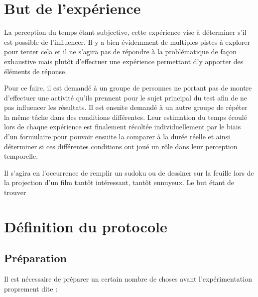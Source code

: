 \documentclass[12pt,fleqn,oneside]{book} %
\begin{document}
\section{But de l'expérience}
La perception du temps étant subjective, cette expérience vise à déterminer s'il est possible de l'influencer. Il y a bien évidemment de multiples pistes à explorer pour tenter cela et il ne s'agira pas de répondre à la problématique de façon exhaustive mais plutôt d'effectuer une expérience permettant d'y apporter des éléments de réponse. 

Pour ce faire, il est demandé à un groupe de personnes ne portant pas de montre d'effectuer une activité qu'ils prennent pour le sujet principal du test afin de ne pas influencer les résultats. Il est ensuite demandé à un autre groupe de répéter la même tâche dans des conditions différentes. Leur estimation du temps écoulé lors de chaque expérience est finalement récoltée individuellement par le biais d'un formulaire pour pouvoir ensuite la comparer à la durée réelle et ainsi déterminer si ces différentes conditions ont joué un rôle dans leur perception temporelle.

Il s'agira en l'occurrence de remplir un sudoku ou de dessiner sur la feuille lors de la projection d'un film tantôt intéressant, tantôt ennuyeux. Le but étant de trouver 


\section{Définition du protocole}

\subsection{Préparation}
Il est nécessaire de préparer un certain nombre de choses avant l'expérimentation proprement dite :
\end{document}
